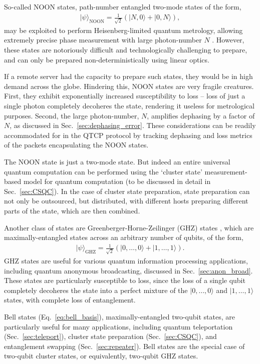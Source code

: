 \documentclass[aps,rmp,twocolumn,amsmath,amssymb,nofootinbib,superscriptaddress]{revtex4}
\newcommand{\ket}[1]{|#1\rangle}
\begin{document}
So-called NOON states, path-number entangled two-mode states of the form,
\begin{align}
\ket\psi_\mathrm{NOON} = \frac{1}{\sqrt{2}}(\ket{N,0}+\ket{0,N}),
\end{align}
may be exploited to perform Heisenberg-limited quantum metrology, allowing extremely precise phase measurement with large photon-number $N$ \cite{???}. However, these states are notoriously difficult and technologically challenging to prepare, and can only be prepared non-deterministically using linear optics.

If a remote server had the capacity to prepare such states, they would be in high demand across the globe. Hindering this, NOON states are very fragile creatures. First, they exhibit exponentially increased susceptibility to loss -- loss of just a single photon completely decoheres the state, rendering it useless for metrological purposes. Second, the large photon-number, $N$, amplifies dephasing by a factor of $N$, as discussed in Sec.~\ref{sec:dephasing_error}. These considerations can be readily accommodated for in the QTCP protocol by tracking dephasing and loss metrics of the packets encapsulating the NOON states.

The NOON state is just a two-mode state. But indeed an entire universal quantum computation can be performed using the `cluster state' measurement-based model for quantum computation (to be discussed in detail in Sec.~\ref{sec:CSQC}). In the case of cluster state preparation, state preparation can not only be outsourced, but distributed, with different hosts preparing different parts of the state, which are then combined.

Another class of states are Greenberger-Horne-Zeilinger (GHZ) states \cite{???}, which are maximally-entangled states across an arbitrary number of qubits, of the form,
\begin{align}
\ket\psi_\mathrm{GHZ} = \frac{1}{\sqrt{2}}(\ket{0,\dots,0} + \ket{1,\dots,1}).
\end{align}
GHZ states are useful for various quantum information processing applications, including quantum anonymous broadcasting, discussed in Sec.~\ref{sec:anon_broad}. These states are particularly susceptible to loss, since the loss of a single qubit completely decoheres the state into a perfect mixture of the \mbox{$\ket{0,\dots,0}$} and \mbox{$\ket{1,\dots,1}$} states, with complete loss of entanglement.

Bell states (Eq.~\ref{eq:bell_basis}), maximally-entangled two-qubit states, are particularly useful for many applications, including quantum teleportation (Sec.~\ref{sec:teleport}), cluster state preparation (Sec.~\ref{sec:CSQC}), and entanglement swapping (Sec.~\ref{sec:repeater}). Bell states are the special case of two-qubit cluster states, or equivalently, two-qubit GHZ states.
\end{document}
